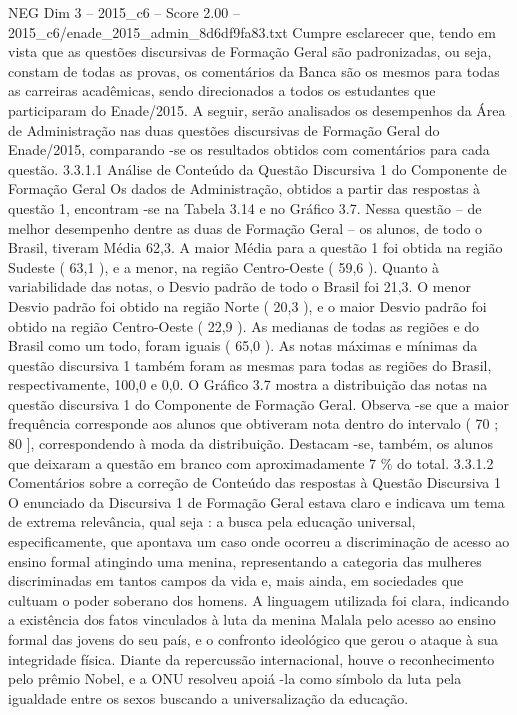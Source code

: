 \begin{textsample}{NEG Dim 3 – 2015\_c6 – Score 2.00 – 2015\_c6/enade\_2015\_admin\_8d6df9fa83.txt}
Cumpre esclarecer que, tendo em vista que as questões discursivas de Formação Geral são padronizadas, ou seja, constam de todas as provas, os comentários da Banca são os mesmos para todas as carreiras acadêmicas, sendo direcionados a todos os estudantes que participaram do Enade/2015.
A seguir, serão analisados os desempenhos da Área de Administração nas duas questões discursivas de Formação Geral do Enade/2015, comparando -se os resultados obtidos com comentários para cada questão. 3.3.1.1 Análise de Conteúdo da Questão Discursiva 1 do Componente de Formação Geral Os dados de Administração, obtidos a partir das respostas à questão 1, encontram -se na Tabela 3.14 e no Gráfico 3.7.
Nessa questão – de melhor desempenho dentre as duas de Formação Geral – os alunos, de todo o Brasil, tiveram Média 62,3.
A maior Média para a questão 1 foi obtida na região Sudeste ( 63,1 ), e a menor, na região Centro-Oeste ( 59,6 ).
Quanto à variabilidade das notas, o Desvio padrão de todo o Brasil foi 21,3.
O menor Desvio padrão foi obtido na região Norte ( 20,3 ), e o maior Desvio padrão foi obtido na região Centro-Oeste ( 22,9 ).
As medianas de todas as regiões e do Brasil como um todo, foram iguais ( 65,0 ).
As notas máximas e mínimas da questão discursiva 1 também foram as mesmas para todas as regiões do Brasil, respectivamente, 100,0 e 0,0.
O Gráfico 3.7 mostra a distribuição das notas na questão discursiva 1 do Componente de Formação Geral.
Observa -se que a maior frequência corresponde aos alunos que obtiveram nota dentro do intervalo ( 70 ; 80 ], correspondendo à moda da distribuição.
Destacam -se, também, os alunos que deixaram a questão em branco com aproximadamente 7 \% do total. 3.3.1.2 Comentários sobre a correção de Conteúdo das respostas à Questão Discursiva 1 O enunciado da Discursiva 1 de Formação Geral estava claro e indicava um tema de extrema relevância, qual seja : a busca pela educação universal, especificamente, que apontava um caso onde ocorreu a discriminação de acesso ao ensino formal atingindo uma menina, representando a categoria das mulheres discriminadas em tantos campos da vida e, mais ainda, em sociedades que cultuam o poder soberano dos homens.
A linguagem utilizada foi clara, indicando a existência dos fatos vinculados à luta da menina Malala pelo acesso ao ensino formal das jovens do seu país, e o confronto ideológico que gerou o ataque à sua integridade física.
Diante da repercussão internacional, houve o reconhecimento pelo prêmio Nobel, e a ONU resolveu apoiá -la como símbolo da luta pela igualdade entre os sexos buscando a universalização da educação.

\end{textsample}
